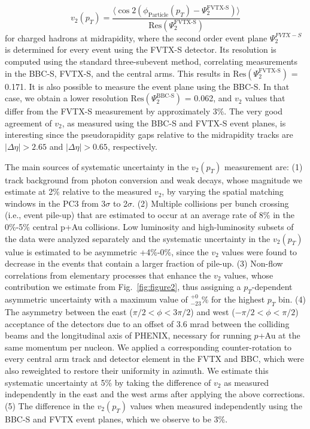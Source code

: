 \documentclass[%
reprint,
showpacs,preprintnumbers,
 amsmath,amssymb,
 aps,
]{revtex4-1}
\newcommand{\pt}{\mbox{$p_T$}\xspace}
\newcommand{\pau}{\mbox{$p$+Au}\xspace}
\begin{document}
\begin{equation}
v_{2}(p_{T}) = \frac{\langle \cos 2(\phi_{\text{Particle}}(p_{T})-\Psi^{\text{FVTX-S}}_{2})\rangle}{\text{Res}(\Psi^{\text{FVTX-S}}_{2})}
\end{equation}
for charged hadrons at midrapidity, where the second order event plane $\Psi^{FVTX-S}_{2}$ is determined for every event using the FVTX-S detector. Its resolution is computed using the standard three-subevent method, correlating measurements in the BBC-S, FVTX-S, and the central arms. This results in $\text{Res}(\Psi^{\text{FVTX-S}}_{2})$ = 0.171. It is also possible to measure the event plane using the BBC-S. In that case, we obtain a lower resolution $\text{Res}(\Psi^{\text{BBC-S}}_{2})$ = 0.062, and $v_2$ values that differ from the FVTX-S measurement by approximately 3\%. The very good agreement of $v_2$, as measured using the BBC-S and FVTX-S event planes, is interesting since the pseudorapidity gaps relative to the midrapidity tracks are $|\Delta\eta| > 2.65$ and $|\Delta\eta| > 0.65$, respectively.

The main sources of systematic uncertainty in the $v_2(p_T)$ measurement are: (1) track background from photon conversion and weak decays, whose magnitude we estimate at 2\% relative to the measured $v_2$, by varying the spatial matching windows in the PC3 from 3$\sigma$ to 2$\sigma$. (2) Multiple collisions per bunch crossing (i.e., event pile-up) that are estimated to occur  at an average rate of 8\% in the 0\%-5\% central p+Au collisions. Low luminosity and high-luminosity subsets of the data were analyzed separately and the systematic uncertainty in the $v_2(p_T)$ value is estimated to be asymmetric  +4\%-0\%, since the $v_2$  values were found to decrease in the events that contain a larger fraction of pile-up. (3) Non-flow correlations from elementary processes that enhance the $v_2$ values, whose contribution we estimate from Fig.~\ref{fig:figure2}, thus assigning a \pt-dependent asymmetric uncertainty with a maximum value of $^{+0}_{-23}\%$ for the highest \pt bin. (4) The asymmetry between the east ($\pi/2 < \phi < 3\pi/2$) and west ($-\pi/2 < \phi < \pi/2$) acceptance of the detectors due to an offset of 3.6 mrad between the colliding beams and the longitudinal axis of PHENIX, necessary for running \pau at the same momentum per nucleon. We applied a corresponding counter-rotation to every central arm track and detector element in the FVTX and BBC, which were also reweighted to restore their uniformity in azimuth. We estimate this systematic uncertainty at 5\% by taking the difference of $v_2$ as measured independently in the east and the west arms after applying the above corrections. (5) The difference in the $v_2(p_T)$ values when measured independently using the BBC-S and FVTX event planes, which we observe to be 3\%. 
\end{document}

